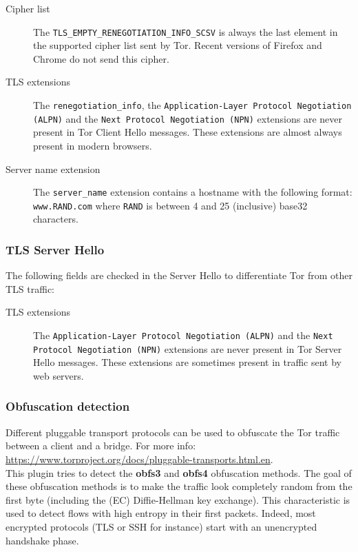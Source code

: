 \documentclass[documentation]{subfiles}
\begin{document}
\begin{description}
    \item[Cipher list] The {\tt TLS\_EMPTY\_RENEGOTIATION\_INFO\_SCSV} is always the last element in the supported cipher list sent by Tor.
        Recent versions of Firefox and Chrome do not send this cipher.
    \item[TLS extensions] The {\tt renegotiation\_info}, the {\tt Application-Layer Protocol Negotiation (ALPN)} and the {\tt Next Protocol Negotiation (NPN)} extensions are never present in Tor Client Hello messages.
        These extensions are almost always present in modern browsers.
    \item[Server name extension] The {\tt server\_name} extension contains a hostname with the following format:
        {\tt www.RAND.com} where {\tt RAND} is between 4 and 25 (inclusive) base32 characters.
\end{description}

\subsubsection{TLS Server Hello}

The following fields are checked in the Server Hello to differentiate Tor from other TLS traffic:

\begin{description}
    \item[TLS extensions] The {\tt Application-Layer Protocol Negotiation (ALPN)} and the {\tt Next Protocol Negotiation (NPN)} extensions are never present in Tor Server Hello messages.
        These extensions are sometimes present in traffic sent by web servers.
\end{description}


\subsubsection{Obfuscation detection}

Different pluggable transport protocols can be used to obfuscate the Tor traffic between a client
and a bridge. For more info: \url{https://www.torproject.org/docs/pluggable-transports.html.en}.\\

This plugin tries to detect the {\bf obfs3} and {\bf obfs4} obfuscation methods. The goal of
these obfuscation methods is to make the traffic look completely random from the first byte
(including the (EC) Diffie-Hellman key exchange). This characteristic is used to detect flows with high
entropy in their first packets. Indeed, most encrypted protocols (TLS or SSH for instance) start with
an unencrypted handshake phase.
\end{document}
